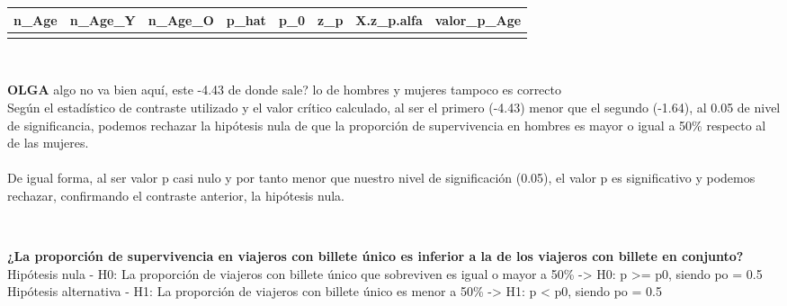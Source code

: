 \documentclass[
]{article}
\begin{document}
\begin{table}
\centering
\begin{tabular}[t]{rrrrrrrr}
\toprule
n\_Age & n\_Age\_Y & n\_Age\_O & p\_hat & p\_0 & z\_p & X.z\_p.alfa & valor\_p\_Age\\
\midrule
\cellcolor{gray!6}{342} & \cellcolor{gray!6}{70} & \cellcolor{gray!6}{272} & \cellcolor{gray!6}{0.2046784} & \cellcolor{gray!6}{0.5} & \cellcolor{gray!6}{-10.92291} & \cellcolor{gray!6}{-1.644854} & \cellcolor{gray!6}{0}\\
\bottomrule
\end{tabular}
\end{table}

\texttt{}~\\
\texttt{}

\textbf{OLGA} algo no va bien aquí, este -4.43 de donde sale? lo de
hombres y mujeres tampoco es correcto \texttt{}\\
Según el estadístico de contraste utilizado y el valor crítico
calculado, al ser el primero (-4.43) menor que el segundo (-1.64), al
0.05 de nivel de significancia, podemos rechazar la hipótesis nula de
que la proporción de supervivencia en hombres es mayor o igual a 50\%
respecto al de las mujeres.\\
\texttt{}~\\
De igual forma, al ser valor p casi nulo y por tanto menor que nuestro
nivel de significación (0.05), el valor p es significativo y podemos
rechazar, confirmando el contraste anterior, la hipótesis nula.

\texttt{}\\
\texttt{}

\textbf{¿La proporción de supervivencia en viajeros con billete único es
inferior a la de los viajeros con billete en conjunto?} \texttt{}\\
Hipótesis nula - H0: La proporción de viajeros con billete único que
sobreviven es igual o mayor a 50\% -\textgreater{} H0: p \textgreater=
p0, siendo po = 0.5\\
Hipótesis alternativa - H1: La proporción de viajeros con billete único
es menor a 50\% -\textgreater{} H1: p \textless{} p0, siendo po = 0.5

\texttt{}
\end{document}
